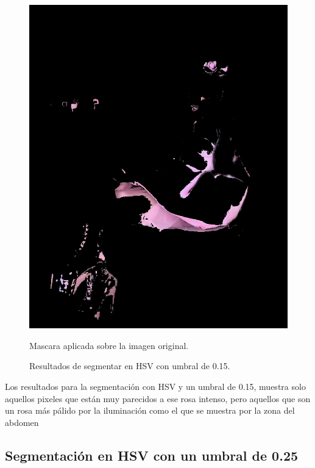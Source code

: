\documentclass[11pt, letterpaper]{article}
\begin{document}
\begin{figure}[h!]
\begin{minipage}{0.35\textwidth}
		\includegraphics[width=\textwidth]{IMG/R13.jpg}
		\caption*{Mascara aplicada sobre la imagen original.}
	\end{minipage}
	\caption{Resultados de segmentar en HSV con umbral de 0.15.}
	\label{fig:f2}
\end{figure}

Los resultados para la segmentación con HSV y un umbral de 0.15, muestra solo aquellos pixeles que están muy parecidos a ese rosa intenso, pero aquellos que son un rosa más pálido por la iluminación como el que se muestra por la zona del abdomen

\newpage

\subsection{Segmentación en HSV con un umbral de 0.25}
\end{document}

